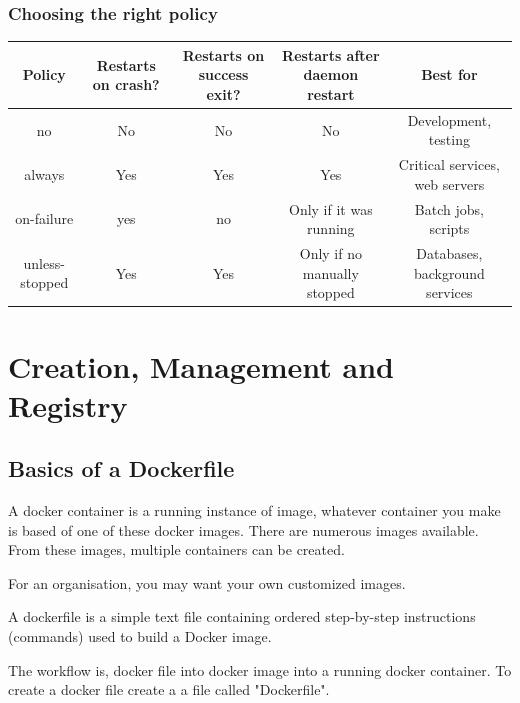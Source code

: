 \documentclass[11pt]{book}
\begin{document}
    \subsection{Choosing the right policy}
    \begin{table}[ht]
        \centering
        \begin{tabular}{|c|c|c|c|c|}
            \hline
            Policy         & Restarts on crash? & Restarts on success exit? & Restarts after daemon restart & Best for \\ \hline
            no             & No                 & No                        & No                            & Development, testing           \\ \hline
            always         & Yes                & Yes                       & Yes                           & Critical services, web servers \\ \hline
            on-failure     & yes                & no                        & Only if it was running        & Batch jobs, scripts            \\ \hline
            unless-stopped & Yes                & Yes                       & Only if no manually stopped   & Databases, background services \\ \hline
        \end{tabular}
    \end{table}


    \chapter{Creation, Management and Registry}


    \section{Basics of a Dockerfile}
    A docker container is a running instance of image, whatever container you make is based of one of these docker images.
    There are numerous images available. From these images, multiple containers can be created.

    For an organisation, you may want your own customized images.

    A dockerfile is a simple text file containing ordered step-by-step instructions (commands) used to build a Docker image.

    The workflow is, docker file into docker image into a running docker container.
    To create a docker file create a a file called "Dockerfile".
\end{document}
